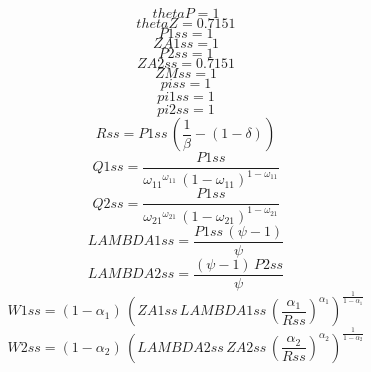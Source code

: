 \begin{dmath*}
thetaP = 1
\end{dmath*}
\begin{dmath*}
thetaZ = 0.7151
\end{dmath*}
\begin{dmath*}
P1ss = 1
\end{dmath*}
\begin{dmath*}
ZA1ss = 1
\end{dmath*}
\begin{dmath*}
P2ss = 1
\end{dmath*}
\begin{dmath*}
ZA2ss = 0.7151
\end{dmath*}
\begin{dmath*}
ZMss = 1
\end{dmath*}
\begin{dmath*}
piss = 1
\end{dmath*}
\begin{dmath*}
pi1ss = 1
\end{dmath*}
\begin{dmath*}
pi2ss = 1
\end{dmath*}
\begin{dmath*}
Rss = {P1ss}\, \left(\frac{1}{{{\beta}}}-\left(1-{{\delta}}\right)\right)
\end{dmath*}
\begin{dmath*}
Q1ss = \frac{{P1ss}}{{{\omega_{11}}}^{{{\omega_{11}}}}\, \left(1-{{\omega_{11}}}\right)^{1-{{\omega_{11}}}}}
\end{dmath*}
\begin{dmath*}
Q2ss = \frac{{P1ss}}{{{\omega_{21}}}^{{{\omega_{21}}}}\, \left(1-{{\omega_{21}}}\right)^{1-{{\omega_{21}}}}}
\end{dmath*}
\begin{dmath*}
LAMBDA1ss = \frac{{P1ss}\, \left({{\psi}}-1\right)}{{{\psi}}}
\end{dmath*}
\begin{dmath*}
LAMBDA2ss = \frac{\left({{\psi}}-1\right)\, {P2ss}}{{{\psi}}}
\end{dmath*}
\begin{dmath*}
W1ss = \left(1-{{\alpha_{1}}}\right)\, \left({ZA1ss}\, {LAMBDA1ss}\, \left(\frac{{{\alpha_{1}}}}{{Rss}}\right)^{{{\alpha_{1}}}}\right)^{\frac{1}{1-{{\alpha_{1}}}}}
\end{dmath*}
\begin{dmath*}
W2ss = \left(1-{{\alpha_{2}}}\right)\, \left({LAMBDA2ss}\, {ZA2ss}\, \left(\frac{{{\alpha_{2}}}}{{Rss}}\right)^{{{\alpha_{2}}}}\right)^{\frac{1}{1-{{\alpha_{2}}}}}
\end{dmath*}
